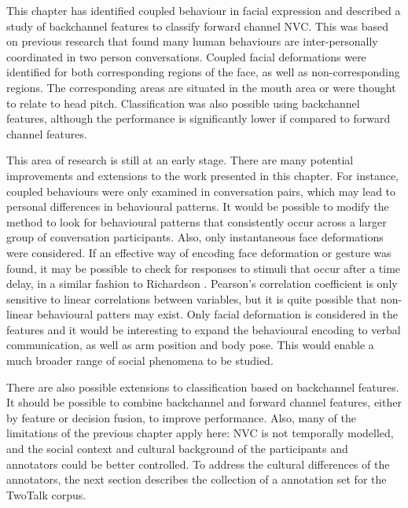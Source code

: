This chapter has identified coupled behaviour in facial expression and described a study of backchannel features to classify forward channel \ac{NVC}. This was based on previous research that found many human behaviours are inter-personally coordinated in two person conversations. Coupled facial deformations were identified for both corresponding regions of the face, as well as non-corresponding regions. The corresponding areas are situated in the mouth area or were thought to relate to head pitch. Classification was also possible using backchannel features, although the performance is significantly lower if compared to forward channel features. 

This area of research is still at an early stage. There are many potential improvements and extensions to the work presented in this chapter. For instance, coupled behaviours were only examined in conversation pairs, which may lead to personal differences in behavioural patterns. It would be possible to modify the method to look for behavioural patterns that consistently occur across a larger group of conversation participants. Also, only instantaneous face deformations were considered. If an effective way of encoding face deformation or gesture was found, it may be possible to check for responses to stimuli that occur after a time delay, in a similar fashion to Richardson \etal \cite{Richardson2007}. Pearson's correlation coefficient is only sensitive to linear correlations between variables, but it is quite possible that non-linear behavioural patters may exist. Only facial deformation is considered in the features and it would be interesting to expand the behavioural encoding to verbal communication, as well as arm position and body pose. This would enable a much broader range of social phenomena to be studied.

There are also possible extensions to classification based on backchannel features. It should be possible to combine backchannel and forward channel features, either by feature or decision fusion, to improve performance. Also, many of the limitations of the previous chapter apply here: \ac{NVC} is not temporally modelled, and the social context and cultural background of the participants and annotators could be better controlled. To address the cultural differences of the annotators, the next section describes the collection of a \culturallySpecific annotation set for the TwoTalk corpus.

